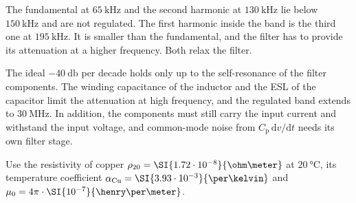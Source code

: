 
\begin{solutionblock}
	The fundamental at $\SI{65}{\kilo\hertz}$ and the second harmonic at $\SI{130}{\kilo\hertz}$ lie below $\SI{150}{\kilo\hertz}$ and are not regulated. The first harmonic inside the band is the third one at $\SI{195}{\kilo\hertz}$. It is smaller than the fundamental, and the filter has to provide its attenuation at a higher frequency. Both relax the filter.
\end{solutionblock}


\begin{solutionblock}
	The ideal $-\SI{40}{\decibel}$ per decade holds only up to the self-resonance of the filter components. The winding capacitance of the inductor and the ESL of the capacitor limit the attenuation at high frequency, and the regulated band extends to $\SI{30}{\mega\hertz}$. In addition, the components must still carry the input current and withstand the input voltage, and common-mode noise from $C_\mathrm{p}\,\mathrm{d}v/\mathrm{d}t$ needs its own filter stage.
\end{solutionblock}



Use the resistivity of copper $\rho_{20}=\SI{1.72 \cdot 10^{-8}}{\ohm\meter}$ at $\SI{20}{\celsius}$, its temperature coefficient $\alpha_\mathrm{Cu}=\SI{3.93 \cdot 10^{-3}}{\per\kelvin}$ and $\mu_0=4\pi\cdot\SI{10^{-7}}{\henry\per\meter}$.


